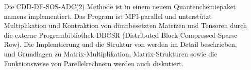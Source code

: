 Die CDD-DF-SOS-ADC(2) Methode ist in einem neuem Quantenchemiepaket namens \mchem{} implementiert.  
Das Program ist MPI-parallel und unterstützt Multiplikation und Kontraktion von dünnbesetzten Matrizen und Tensoren durch die externe Programbibliothek DBCSR (Distributed Block-Compressed Sparse Row). 
Die Implemtierung und die Struktur von \mchem{} werden im Detail beschrieben, und Grundlagen zu Matrix-Multiplikation, Matrix-Strukturen sowie die Funktionsweise von Parellelrechnern werden auch diskutiert.


\nonewpage

